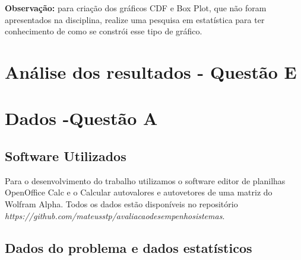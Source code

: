 \documentclass[11pt,a4paper,openany,oneside]{abntex2}
\begin{document}
\textbf{Observação:} para criação dos gráficos CDF e Box Plot, que não foram apresentados na disciplina, realize uma pesquisa em estatística para ter conhecimento de como se constrói esse tipo de gráfico.
	
\chapter{Análise dos resultados - Questão E}
	
	
\chapter{Dados -Questão A}

\section{\textbf{Software Utilizados}}
	Para o desenvolvimento do trabalho utilizamos o software editor de planilhas OpenOffice Calc e o Calcular autovalores e autovetores de uma matriz do Wolfram Alpha\cite{img}.
	Todos os dados estão disponíveis no repositório \textit{https://github.com/mateusstp/avaliacaodesempenhosistemas}.



\section{\textbf{Dados do problema e dados estatísticos }}

	
\end{document}
